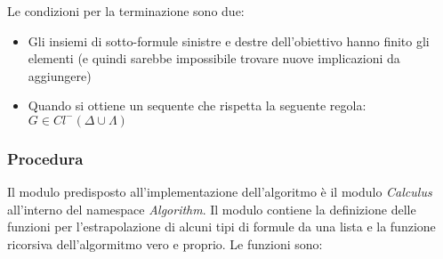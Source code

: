 \documentclass[\main/tesi.tex]{subfiles}
\begin{document}
Le condizioni per la terminazione sono due:
\begin{itemize}
    \item Gli insiemi di sotto-formule sinistre e destre dell'obiettivo hanno finito gli elementi (e quindi sarebbe impossibile trovare nuove implicazioni da aggiungere)
    \item Quando si ottiene un sequente che rispetta la seguente regola: $G \in Cl^{-}(\Delta \cup \Lambda)$
\end{itemize}

\subsubsection{Procedura}
Il modulo predisposto all'implementazione dell'algoritmo è il modulo \textit{Calculus} all'interno del namespace \textit{Algorithm}. Il modulo contiene la definizione delle funzioni per l'estrapolazione di alcuni tipi di formule da una lista e la funzione ricorsiva dell'algormitmo vero e proprio. Le funzioni sono:
\end{document}
